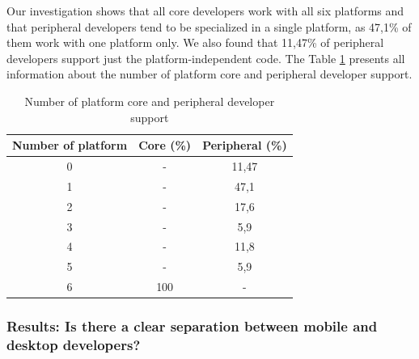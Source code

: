 \documentclass[10pt, conference]{IEEEtran}
\begin{document}


Our investigation shows that all core developers work with all six platforms and that peripheral developers tend to be specialized in a single platform, as 47,1\% of them work with one platform only. We also found that 11,47\% of peripheral developers support just the platform-independent code. The Table \ref{plat} presents all information about the number of platform core and peripheral developer support.    


\begin{table}[h]
\renewcommand{\arraystretch}{1.3}
\caption{Number of platform core and peripheral developer support}
\label{plat}
\centering
\begin{tabular}{|c|c|c|}
\hline
Number of platform & Core (\%) & Peripheral (\%)\\
\hline
0 & 	- & 	11,47 \\
\hline
1 & 	- & 	47,1 \\
\hline
2 & 	-& 		17,6\\
\hline
3 &		- &		5,9\\
\hline
4 & 	- & 	11,8\\
\hline
5 & 	- & 	5,9  \\
\hline
6 & 	100 & 	-  \\
\hline
\end{tabular}
\end{table} 






\subsubsection{Results: Is there a clear separation between mobile and desktop developers?}
\end{document}
